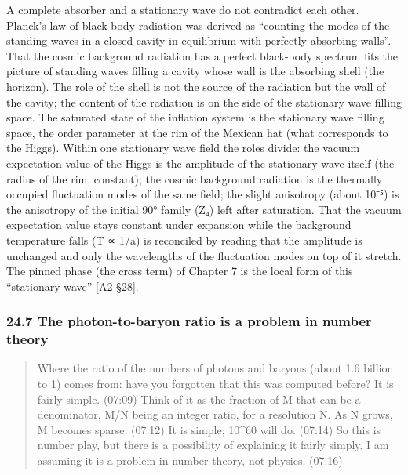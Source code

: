 \documentclass[
  a4paper,
]{article}
\begin{document}
A complete absorber and a stationary wave do not contradict each other.
Planck's law of black-body radiation was derived as ``counting the modes
of the standing waves in a closed cavity in equilibrium with perfectly
absorbing walls''. That the cosmic background radiation has a perfect
black-body spectrum fits the picture of standing waves filling a cavity
whose wall is the absorbing shell (the horizon). The role of the shell
is not the source of the radiation but the wall of the cavity; the
content of the radiation is on the side of the stationary wave filling
space. The saturated state of the inflation system is the stationary
wave filling space, the order parameter at the rim of the Mexican hat
(what corresponds to the Higgs). Within one stationary wave field the
roles divide: the vacuum expectation value of the Higgs is the amplitude
of the stationary wave itself (the radius of the rim, constant); the
cosmic background radiation is the thermally occupied fluctuation modes
of the same field; the slight anisotropy (about 10⁻⁵) is the anisotropy
of the initial 90° family (Z₄) left after saturation. That the vacuum
expectation value stays constant under expansion while the background
temperature falls (T ∝ 1/a) is reconciled by reading that the amplitude
is unchanged and only the wavelengths of the fluctuation modes on top of
it stretch. The pinned phase (the cross term) of Chapter 7 is the local
form of this ``stationary wave'' {[}A2 §28{]}.

\subsubsection{24.7 The photon-to-baryon ratio is a problem in number
theory}\label{the-photon-to-baryon-ratio-is-a-problem-in-number-theory}

\begin{quote}
Where the ratio of the numbers of photons and baryons (about 1.6 billion
to 1) comes from: have you forgotten that this was computed before? It
is fairly simple. (07:09) Think of it as the fraction of M that can be a
denominator, M/N being an integer ratio, for a resolution N. As N grows,
M becomes sparse. (07:12) It is simple; 10\^{}60 will do. (07:14) So
this is number play, but there is a possibility of explaining it fairly
simply. I am assuming it is a problem in number theory, not physics.
(07:16)
\end{quote}
\end{document}
